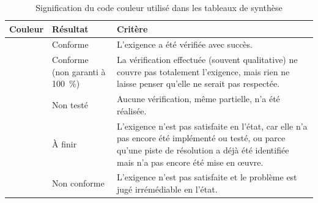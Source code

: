 \begin{table}[H]
    \centering
    \caption{Signification du code couleur utilisé dans les tableaux de synthèse}
    \label{tab:legende-couleurs}
    \begin{tabular}{|>{\centering\arraybackslash}p{1.8cm}|p{3cm}|p{9.2cm}|}
    \hline
    \textbf{Couleur} & \textbf{Résultat} & \textbf{Critère} \\
    \hline
    \cellcolor{resConforme} & Conforme & L'exigence a été vérifiée avec succès. \\
    \hline
    \cellcolor{resPartiel} & Conforme (non garanti à 100~\%) & La vérification effectuée (souvent qualitative) ne couvre pas totalement l'exigence, mais rien ne laisse penser qu'elle ne serait pas respectée. \\
    \hline
    \cellcolor{resNonVerifie} & Non testé & Aucune vérification, même partielle, n'a été réalisée. \\
    \hline
    \cellcolor{resAFaire} & À finir & L'exigence n'est pas satisfaite en l'état, car elle n'a pas encore été implémenté ou testé, ou parce qu'une piste de résolution a déjà été identifiée mais n'a pas encore été mise en œuvre. \\
    \hline
    \cellcolor{resNonConforme} & Non conforme & L'exigence n'est pas satisfaite et le problème est jugé irrémédiable en l'état. \\
    \hline
    \end{tabular}
\end{table}

